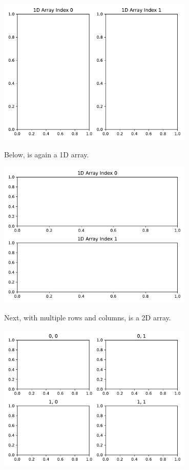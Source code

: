 \begin{center}
    \includegraphics[width = 0.7\textwidth]{figures/proseplots/subplots-1d.pdf}
\end{center}

Below,  is again a 1D array. 


\begin{center}
    \includegraphics[width = 0.7\textwidth]{figures/proseplots/subplots-1d-vert.pdf}
\end{center}

Next, with multiple rows and columns,  is a 2D array.


\begin{center}
    \includegraphics[width = 0.7\textwidth]{figures/proseplots/subplots-2d.pdf}
\end{center}


